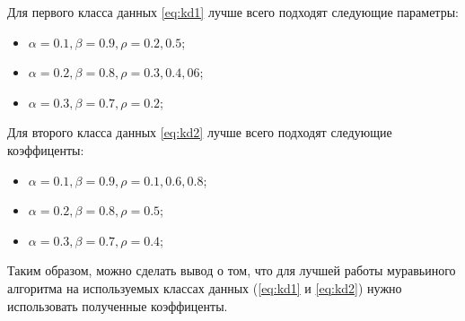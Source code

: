 Для первого класса данных \ref{eq:kd1} лучше всего подходят следующие параметры:
\begin{itemize}
    \item $\alpha = 0.1, \beta = 0.9, \rho = 0.2, 0.5$;
    \item $\alpha = 0.2, \beta = 0.8, \rho = 0.3, 0.4, 06$;
    \item $\alpha = 0.3, \beta = 0.7, \rho = 0.2$;
\end{itemize}  

Для второго класса данных \ref{eq:kd2} лучше всего подходят следующие коэффиценты:
\begin{itemize}
    \item $\alpha = 0.1, \beta = 0.9, \rho = 0.1, 0.6, 0.8$;
    \item $\alpha = 0.2, \beta = 0.8, \rho = 0.5$;
    \item $\alpha = 0.3, \beta = 0.7, \rho = 0.4$;
\end{itemize}  

Таким образом, можно сделать вывод о том, что для лучшей работы муравьиного алгоритма на используемых классах данных (\ref{eq:kd1} и \ref{eq:kd2}) нужно использовать полученные коэффиценты.



